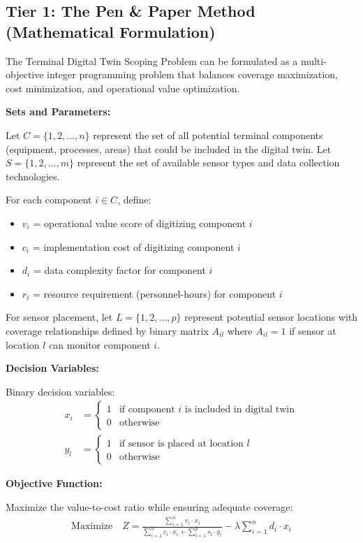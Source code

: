 \documentclass{article}
\begin{document}
\subsection{Tier 1: The Pen \& Paper Method (Mathematical Formulation)}

The Terminal Digital Twin Scoping Problem can be formulated as a multi-objective integer programming problem that balances coverage maximization, cost minimization, and operational value optimization.

\textbf{Sets and Parameters:}

Let $C = \{1, 2, \ldots, n\}$ represent the set of all potential terminal components (equipment, processes, areas) that could be included in the digital twin. Let $S = \{1, 2, \ldots, m\}$ represent the set of available sensor types and data collection technologies.

For each component $i \in C$, define:
\begin{itemize}
\item $v_i$ = operational value score of digitizing component $i$
\item $c_i$ = implementation cost of digitizing component $i$
\item $d_i$ = data complexity factor for component $i$
\item $r_i$ = resource requirement (personnel-hours) for component $i$
\end{itemize}

For sensor placement, let $L = \{1, 2, \ldots, p\}$ represent potential sensor locations with coverage relationships defined by binary matrix $A_{il}$ where $A_{il} = 1$ if sensor at location $l$ can monitor component $i$.

\textbf{Decision Variables:}

Binary decision variables:
\begin{align}
x_i &= \begin{cases} 
1 & \text{if component } i \text{ is included in digital twin} \\
0 & \text{otherwise}
\end{cases} \\
y_l &= \begin{cases} 
1 & \text{if sensor is placed at location } l \\
0 & \text{otherwise}
\end{cases}
\end{align}

\textbf{Objective Function:}

Maximize the value-to-cost ratio while ensuring adequate coverage:
\begin{align}
\text{Maximize} \quad Z = \frac{\sum_{i=1}^{n} v_i \cdot x_i}{\sum_{i=1}^{n} c_i \cdot x_i + \sum_{l=1}^{p} s_l \cdot y_l} - \lambda \sum_{i=1}^{n} d_i \cdot x_i
\end{align}
\end{document}

